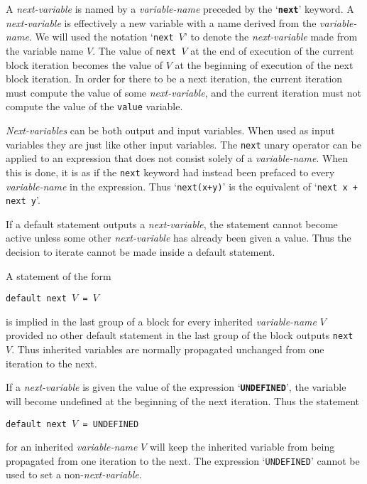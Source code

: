 \documentclass[12pt]{article}
\makeatletter
\newcommand{\ttkey}[1]{{\tt \bf #1}\index{#1@{\tt #1}}}
\makeatother
\begin{document}
A {\em next-variable} is named by a {\em variable-name} preceded by
the `\ttkey{next}' keyword.  A {\em next-variable}
is effectively a new variable with a name derived from the
{\em variable-name}.  We will used the notation `\verb|next |$V$'
to denote the {\em next-variable} made from the variable name $V$.
The value of \verb|next |$V$ at the end of execution of the
current block iteration becomes the value of $V$ at the beginning
of execution of the next block iteration.  In order for there to be
a next iteration, the current iteration must compute the value of
some {\em next-variable}, and the current iteration must not compute
the value of the {\tt value} variable.

{\em Next-variables} can be both output and input variables.
When used as input variables they are just like other input variables.
The {\tt next} unary operator can be applied to an expression that does not
consist solely of a {\em variable-name}.  When this is done, it is
as if the {\tt next} keyword had instead been prefaced to every
{\em variable-name} in the expression.  Thus `\verb|next(x+y)|' is
the equivalent of `\verb|next x + next y|'.

If a default statement outputs a {\em next-variable}, the statement
cannot become active unless some other {\em next-variable} has already
been given a value.  Thus the decision to iterate cannot be made inside
a default statement.

A statement of the form

\begin{center}
\verb|default next |$V$\verb| = |$V$
\end{center}

is implied in the last group of a block
for every inherited {\em variable-name} $V$ provided
no other default statement in the last group of the block
outputs \verb|next |$V$.
Thus inherited variables are normally propagated unchanged from
one iteration to the next.

If a {\em next-variable} is given the value of
the expression `\ttkey{UNDEFINED}',\label{UNDEFINED}
the variable will become undefined
at the beginning of the next iteration.  Thus the statement

\begin{center}
\verb|default next |$V$\verb| = UNDEFINED|
\end{center}

for an inherited {\em variable-name} $V$ will keep the inherited
variable from being propagated from one iteration to the next.
The expression `{\tt UNDEFINED}' cannot be used to set a
non-{\em next-variable}.
\end{document}
